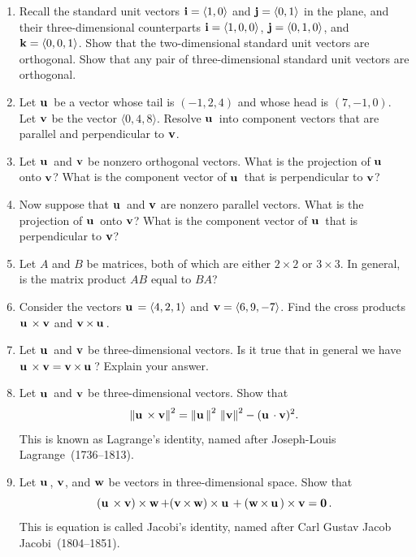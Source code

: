\begin{enumerate}
\item Recall the standard unit vectors
  $\veci = \langle 1, 0 \rangle$ and $\vecj = \langle 0, 1 \rangle$ in
  the plane, and their three-dimensional counterparts
  $\veci = \langle 1, 0, 0 \rangle$,
  $\vecj = \langle 0, 1, 0 \rangle$, and
  $\veck = \langle 0, 0, 1 \rangle$. Show that the two-dimensional
  standard unit vectors are orthogonal. Show that any pair of
  three-dimensional standard unit vectors are orthogonal.

\item Let $\vecu$ be a vector whose tail is $(-1, 2, 4)$ and whose
  head is $(7, -1, 0)$. Let $\vecv$ be the vector
  $\langle 0, 4, 8 \rangle$. Resolve $\vecu$ into component vectors
  that are parallel and perpendicular to $\vecv$.

\item Let $\vecu$ and $\vecv$ be nonzero orthogonal vectors. What is
  the projection of $\vecu$ onto $\vecv$? What is the component vector
  of $\vecu$ that is perpendicular to $\vecv$?

\item Now suppose that $\vecu$ and $\vecv$ are nonzero parallel
  vectors. What is the projection of $\vecu$ onto $\vecv$? What is the
  component vector of $\vecu$ that is perpendicular to $\vecv$?

\item Let $A$ and $B$ be matrices, both of which are either $2 \times 2$
  or $3 \times 3$. In general, is the matrix product $AB$ equal to $BA$?

\item Consider the vectors $\vecu = \langle 4, 2, 1 \rangle$
  and $\vecv = \langle 6, 9, -7 \rangle$. Find the cross products
  $\vecu \times \vecv$ and $\vecv \times \vecu$.

\item Let $\vecu$ and $\vecv$ be three-dimensional vectors. Is it true
  that in general we have $\vecu \times \vecv = \vecv \times \vecu$?
  Explain your answer.

\item Let $\vecu$ and $\vecv$ be three-dimensional vectors. Show
  that
  \[
  \vecvertl \vecu \times \vecv \vecvertr^2
  =
  \vecvertl \vecu \vecvertr^2 \,
  \vecvertl \vecv \vecvertr^2
  -
  (\vecu \cdot \vecv)^2.
  \]
  This is known as Lagrange's identity,
  named after Joseph-Louis
  Lagrange~(1736--1813).

\item Let $\vecu$, $\vecv$, and $\vecw$ be vectors in
  three-dimensional space. Show that
  \[
  (\vecu \times \vecv) \times \vecw
  +
  (\vecv \times \vecw) \times \vecu
  +
  (\vecw \times \vecu) \times \vecv
  =
  \veczero.
  \]
  This is equation is called Jacobi's
  identity, named after Carl Gustav Jacob
  Jacobi~(1804--1851).
\end{enumerate}
